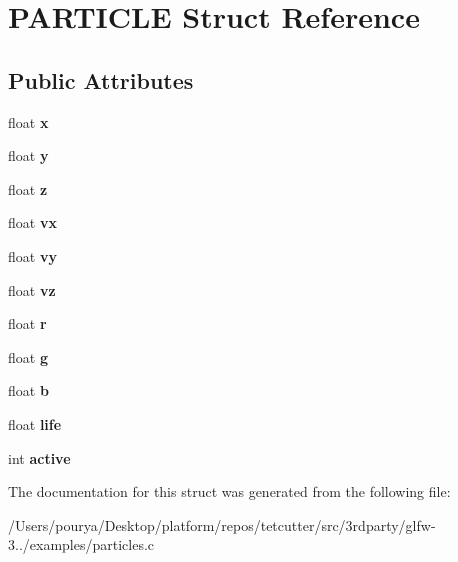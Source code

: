 \hypertarget{structPARTICLE}{}\section{P\+A\+R\+T\+I\+C\+L\+E Struct Reference}
\label{structPARTICLE}
\subsection*{Public Attributes}
\begin{DoxyCompactItemize}
\item 
\hypertarget{structPARTICLE_a65eb5c74108f38600a1609f5b970bc8f}{}float {\bfseries x}\label{structPARTICLE_a65eb5c74108f38600a1609f5b970bc8f}

\item 
\hypertarget{structPARTICLE_a87855035240c095c72a5b6e6544ae091}{}float {\bfseries y}\label{structPARTICLE_a87855035240c095c72a5b6e6544ae091}

\item 
\hypertarget{structPARTICLE_a9b22d44b85b0e191d0f06a20d5142bfa}{}float {\bfseries z}\label{structPARTICLE_a9b22d44b85b0e191d0f06a20d5142bfa}

\item 
\hypertarget{structPARTICLE_ad80d4fe7fe0fba34ddaada720f491047}{}float {\bfseries vx}\label{structPARTICLE_ad80d4fe7fe0fba34ddaada720f491047}

\item 
\hypertarget{structPARTICLE_aa2ca35cc01733b3bb327be2d993cb110}{}float {\bfseries vy}\label{structPARTICLE_aa2ca35cc01733b3bb327be2d993cb110}

\item 
\hypertarget{structPARTICLE_a810d416317f214678fcadea90ba77bb0}{}float {\bfseries vz}\label{structPARTICLE_a810d416317f214678fcadea90ba77bb0}

\item 
\hypertarget{structPARTICLE_a41415bfa22d30ac4f5b900a13851c341}{}float {\bfseries r}\label{structPARTICLE_a41415bfa22d30ac4f5b900a13851c341}

\item 
\hypertarget{structPARTICLE_a00ff75095cf7a9644999d85bbfef8882}{}float {\bfseries g}\label{structPARTICLE_a00ff75095cf7a9644999d85bbfef8882}

\item 
\hypertarget{structPARTICLE_abfa655ecac92bac46564198e6fc8e9ba}{}float {\bfseries b}\label{structPARTICLE_abfa655ecac92bac46564198e6fc8e9ba}

\item 
\hypertarget{structPARTICLE_a7300043e016c1e771e3dbc8422ae4e9a}{}float {\bfseries life}\label{structPARTICLE_a7300043e016c1e771e3dbc8422ae4e9a}

\item 
\hypertarget{structPARTICLE_a5ed7627f6739188fe7bff7bf73e8e1e6}{}int {\bfseries active}\label{structPARTICLE_a5ed7627f6739188fe7bff7bf73e8e1e6}

\end{DoxyCompactItemize}


The documentation for this struct was generated from the following file\+:\begin{DoxyCompactItemize}
\item 
/\+Users/pourya/\+Desktop/platform/repos/tetcutter/src/3rdparty/glfw-\/3../examples/particles.\+c\end{DoxyCompactItemize}

